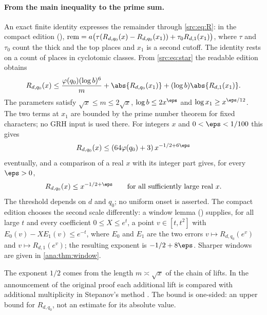 \paragraph{From the main inequality to the prime sum.}
An exact finite identity expresses the remainder through \eqref{src:eq:R}: in the compact
edition (),
$\mathrm{rem}=a\bigl(\tau(R_{d,q_0}(x)-R_{d,q_0}(x_1))+\tau_0R_{d,1}(x_1)\bigr)$, where $\tau$ and
$\tau_0$ count the thick and the top places and $x_1$ is a second cutoff. The identity rests
on a count of places in cyclotomic classes. From \eqref{src:eq:star} the readable edition
obtains
\begin{equation}\label{src:eq:cutoffs}
R_{d,q_0}(x)\le\frac{\varphi(q_0)(\log b)^6}{m}+\abs{R_{d,q_0}(x_1)}+(\log b)\abs{R_{d,1}(x_1)} .
\end{equation}
The parameters satisfy $\sqrt x\le m\le2\sqrt x$, $\log b\le2x^{\eps}$ and
$\log x_1\ge x^{\eps/12}$. The two terms at $x_1$ are bounded by the prime number theorem for
fixed characters; no GRH input is used there. For integers $x$ and $0<\eps<1/100$ this gives
\begin{equation}\label{src:eq:onesided-int}
R_{d,q_0}(x)\le(64\varphi(q_0)+3)\,x^{-1/2+6\eps}
\end{equation}
eventually, and a comparison of a real $x$ with its integer part gives, for every $\eps>0$,
\begin{equation}\label{src:eq:onesided}
R_{d,q_0}(x)\le x^{-1/2+\eps}\qquad\text{for all sufficiently large real }x .
\end{equation}
The threshold depends on $d$ and $q_0$; no uniform onset is asserted. The compact edition
chooses the second scale differently: a window lemma
() supplies, for all large $t$ and every coefficient
$0\le X\le e^t$, a point $v\in[t,t^2]$ with $E_0(v)-XE_1(v)\le e^{-t}$, where $E_0$ and $E_1$
are the two errors $v\mapsto R_{d,q_0}(e^v)$ and $v\mapsto R_{d,1}(e^v)$; the resulting
exponent is $-1/2+8\eps$. Sharper windows are given in \cref{ana:thm:window}.

The exponent $1/2$ comes from the length $m\asymp\sqrt x$ of the chain of lifts. In the
announcement of the original proof each additional lift is compared with additional
multiplicity in Stepanov's method \cite{Alpoge2026Remark}. The bound is one-sided: an upper
bound for $R_{d,q_0}$, not an estimate for its absolute value.

